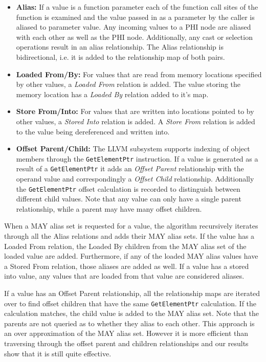 \documentclass[preprint]{sigplanconf}
\begin{document}
\begin{itemize}

\item {\bf Alias:} If a value is a function parameter each of the function call sites of the function is examined and the value passed in as a parameter by the caller is aliased to parameter value. Any incoming values to a PHI node are aliased with each other as well as the PHI node. Additionally, any cast or selection operations result in an alias relationship. The Alias relationship is bidirectional, i.e. it is added to the relationship map of both pairs.

\item {\bf Loaded From/By:} For values that are read from memory locations specified by other values, a \emph{Loaded From} relation is added. The value storing the memory location has a \emph{Loaded By} relation added to it's map.

\item {\bf Store From/Into:} For values that are written into locations pointed to by other values, a \emph{Stored Into} relation is added. A \emph{Store From} relation is added to the value being dereferenced and written into.

\item {\bf Offset Parent/Child:} The LLVM subsystem supports indexing of object members through the \verb+GetElementPtr+ instruction. If a value is generated as a result of a \verb+GetElementPtr+ it adds an \emph{Offset Parent} relationship with the operand value and correspondingly a \emph{Offset Child} relationship. Additionally the \verb+GetElementPtr+ offset calculation is recorded to distinguish between different child values. Note that any value can only have a single parent relationship, while a parent may have many offset children.

\end{itemize}

When a MAY alias set is requested for a value, the algorithm recursively iterates through all the Alias relations and adds their MAY alias sets. If the value has a Loaded From relation, the Loaded By children from the MAY alias set of the loaded value are added. Furthermore, if any of the loaded MAY alias values have a Stored From relation, those aliases are added as well. If a value has a stored into value, any values that are loaded from that value are considered aliases.

If a value has an Offset Parent relationship, all the relationship maps are iterated over to find offset children that have the same \verb+GetElementPtr+ calculation. If the calculation matches, the child value is added to the MAY alias set. Note that the parents are not queried as to whether they alias to each other. This approach is an over approximation of the MAY alias set. However it is more efficient than traversing through the offset parent and children relationships and our results show that it is still quite effective.
\end{document}
